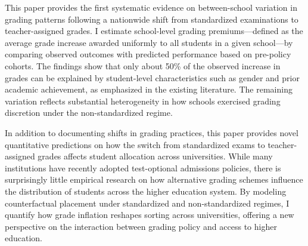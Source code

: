 This paper provides the first systematic evidence on between-school variation in grading patterns following a nationwide shift from standardized examinations to teacher-assigned grades. I estimate school-level grading premiums—defined as the average grade increase awarded uniformly to all students in a given school—by comparing observed outcomes with predicted performance based on pre-policy cohorts. The findings show that only about 50\% of the observed increase in grades can be explained by student-level characteristics such as gender and prior academic achievement, as emphasized in the existing literature. The remaining variation reflects substantial heterogeneity in how schools exercised grading discretion under the non-standardized regime.

In addition to documenting shifts in grading practices, this paper provides novel quantitative predictions on how the switch from standardized exams to teacher-assigned grades affects student allocation across universities. While many institutions have recently adopted test-optional admissions policies, there is surprisingly little empirical research on how alternative grading schemes influence the distribution of students across the higher education system. By modeling counterfactual placement under standardized and non-standardized regimes, I quantify how grade inflation reshapes sorting across universities, offering a new perspective on the interaction between grading policy and access to higher education.

